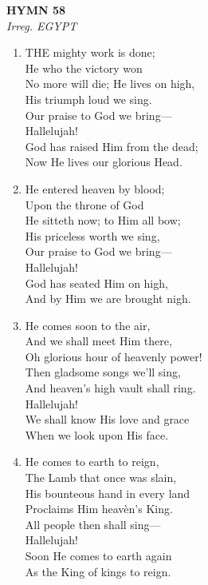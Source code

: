 \newpage
\begin{center}
    {\Large \textbf{HYMN 58}}
    \\
    \textit{Irreg. EGYPT}
\end{center}
\vspace{1em}

\begin{enumerate}
    \item THE mighty work is done; \\
        He who the victory won \\
        No more will die; He lives on high, \\
        His triumph loud we sing. \\
        Our praise to God we bring--- \\
        Hallelujah! \\
        God has raised Him from the dead; \\
        Now He lives our glorious Head.

    \item He entered heaven by blood; \\
        Upon the throne of God \\
        He sitteth now; to Him all bow; \\
        His priceless worth we sing, \\
        Our praise to God we bring--- \\
        Hallelujah! \\
        God has seated Him on high, \\
        And by Him we are brought nigh.

    \item He comes soon to the air, \\
        And we shall meet Him there, \\
        Oh glorious hour of heavenly power! \\
        Then gladsome songs we'll sing, \\
        And heaven's high vault shall ring. \\
        Hallelujah! \\
        We shall know His love and grace \\
        When we look upon His face.

    \item He comes to earth to reign, \\
        The Lamb that once was slain, \\
        His bounteous hand in every land \\
        Proclaims Him heav\`en's King. \\
        All people then shall sing--- \\
        Hallelujah! \\
        Soon He comes to earth again \\
        As the King of kings to reign.

\end{enumerate}


